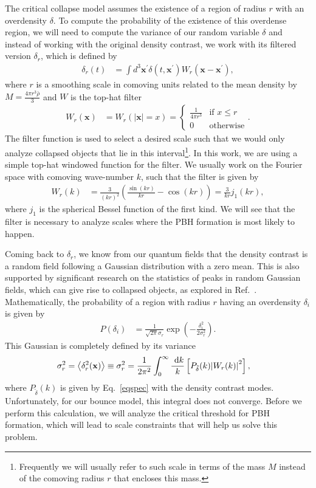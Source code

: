 \documentclass[a4paper,11pt]{article}
\renewcommand{\vec}{\mathbf}
\begin{document}
The critical collapse model assumes the existence of a region of radius $r$ with an overdensity $\delta$. To compute the probability of the existence of this overdense region, we will need to compute the variance of our random variable $\delta$ and instead of working with the original density contrast, we work with its filtered version $\delta_r$, which is defined by
\begin{align}
	\delta_r(t) &=  \int d^{3}\textbf{x}^\prime \delta(t, \vec{x}^\prime) W_r\left(\vec{x} - \vec{x^\prime} \right)
	,\end{align}
where $r$ is a smoothing scale in comoving units related to the mean density by $M = \frac{4\pi r^3 \bar{\rho}}{3}$ and $W$ is the top-hat filter
\begin{align}
	\label{windowf}
	W_r(\vec{x}) &=W_r\left(|\vec{x}| = x\right) = 
	\begin{cases}
		\frac{1}{4\pi r^3} & \text{if $x \leq r$}\\
		0 & \text{otherwise}
	\end{cases}       
	.\end{align}
The filter function is used to select a desired scale such that we would only analyze collapsed objects that lie in this interval\footnote{Frequently we will usually refer to such scale in terms of the mass $M$ instead of the comoving radius $r$ that encloses this mass.}. In this work, we are using a simple top-hat windowed function for the filter. We usually work on the Fourier space with comoving wave-number $k$, such that the filter is given by 
\begin{align}
	W_r(k) &= \frac{3}{(kr)^2}\left(\frac{\sin(kr)}{kr} - \cos(kr)\right) = \frac{3}{kr}j_1(kr)
	,\end{align} 
where $j_1$ is the spherical Bessel function of the first kind. We will see that the filter is necessary to analyze scales where the PBH formation is most likely to happen.

Coming back to $\delta_r$, we know from our quantum fields that the density contrast is a random field following a Gaussian distribution with a zero mean. This is also supported by significant research on the statistics of peaks in random Gaussian fields, which can give rise to collapsed objects, as explored in Ref.~\cite{Bardeen1986statistics}. Mathematically, the probability of a region with radius $r$ having an overdensity $\delta_i$ is given by
\begin{align}
	\label{gaussdelta}
	P(\delta_i) &= \frac{1}{\sqrt{2\pi} \sigma_r} \exp(-\frac{\delta^2_i}{2 \sigma_r^2})
	.\end{align}
This Gaussian is completely defined by its variance
\begin{align}
\label{eqsigmar}
	\sigma_r^2 &=\left< \delta_r^2(\vec{x}) \right> \equiv \sigma_r^2 = \frac{1}{2\pi^2} \int_0^\infty \frac{ \mathrm{~d}{k}}{k}\left[ P_{\tilde{\delta}}(k) \abs{W_r(k)}^2\right]
	,\end{align}
where $P_{\tilde{\delta}}(k)$ is given by Eq.~\eqref{eqspec} with the density contrast modes. Unfortunately, for our bounce model, this integral does not converge. Before we perform this calculation, we will analyze the critical threshold for PBH formation, which will lead to scale constraints that will help us solve this problem.  
\end{document}
